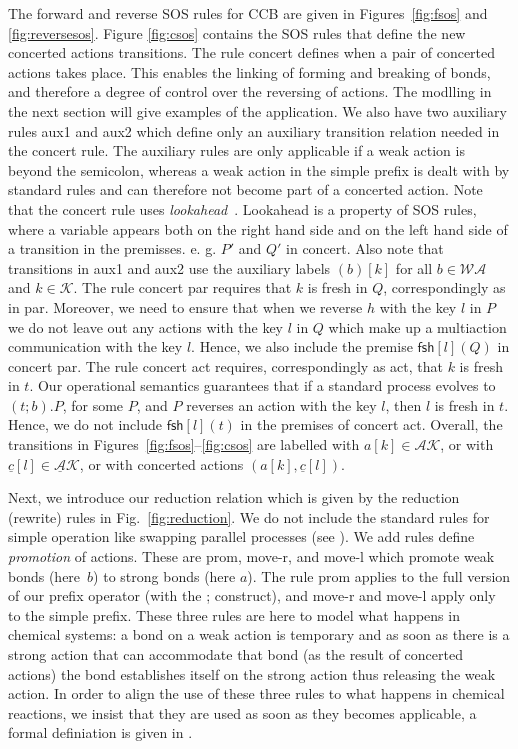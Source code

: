 \documentclass[runningheads]{llncs}
\newcommand{\mWA}{\mathcal{WA}}
\newcommand{\mAK}{\mathcal{AK}}
\newcommand{\umAK}{\underline{\mathcal{A}}\mathcal{K}}
\newcommand{\Keys}{\mathcal{K}}
\newcommand{\fresh}[2]{\mathsf{fsh}[#1](#2)}
\newcommand{\rulename}[1]{\textsf{#1}}
\begin{document}
The forward and reverse SOS rules for CCB are given in Figures~\ref{fig:fsos} and \ref{fig:reversesos}. 
Figure \ref{fig:csos} contains the SOS rules that define the new concerted actions transitions. 
The rule \rulename{concert} defines when a pair of concerted actions 
takes place. This enables the linking of forming and breaking of bonds, and therefore a degree of control over 
the reversing of actions. The modlling in the next section will give examples of the application. We also have two auxiliary rules \rulename{aux1} and \rulename{aux2} which 
define only an auxiliary transition relation needed in the \rulename{concert} rule. The auxiliary rules are only applicable if a weak action is beyond the semicolon, whereas a weak action in the simple prefix is dealt with by standard rules and can therefore not become part of a concerted action. Note that the \rulename{concert} rule uses \emph{lookahead}~\cite{Uli92}. Lookahead is a property of SOS rules, where a variable appears both on the right hand side and on the left hand side of a transition in the premisses. e. g. $P'$ and $Q'$ in \rulename{concert}. 
Also note that transitions in \rulename{aux1} and \rulename{aux2} use the auxiliary labels $(b)[k]$ 
for all $b \in \mWA$ and $k \in \Keys$. The rule \rulename{concert par} requires that $k$ is fresh in $Q$,
correspondingly as in \rulename{par}. Moreover, we need to ensure that when we reverse $h$ with the key $l$
in $P$ we do not leave out any actions with the key $l$ in $Q$ which make up a multiaction 
communication with the key $l$. Hence, we also include the premise $\fresh{l}{Q}$ in \rulename{concert par}.
The rule \rulename{concert act} requires, correspondingly as \rulename{act}, that $k$ is fresh in $t$.
Our operational semantics guarantees that if a standard process evolves to $(t;b).P$, for some $P$, and
$P$ reverses an action with the key $l$, then $l$ is fresh in $t$. Hence, we do not include $\fresh{l}{t}$
in the premises of \rulename{concert act}.
%
%
Overall, the transitions in Figures~\ref{fig:fsos}--\ref{fig:csos} are labelled with $a[k] \in \mAK$, or with 
$\underline{c}[l] \in \umAK$, or with concerted actions $(a[k], \underline{c}[l])$.

Next, we introduce our reduction relation which is given by the reduction (rewrite) rules 
in Fig.~\ref{fig:reduction}. We do not include the standard rules for simple operation like swapping parallel processes (see \cite{KUHN201818}). We add rules define {\em promotion} of actions. These are \rulename{prom}, \rulename{move-r}, and \rulename{move-l} which  
promote weak bonds (here~$b$) to strong bonds (here $a$).
The rule \rulename{prom} applies to the full version of our prefix operator (with the ; construct), and
\rulename{move-r} and \rulename{move-l} apply only to the simple prefix.
These three rules are here to model what happens in chemical systems: a bond on a weak action is 
temporary and as soon as there is a strong action that can accommodate that bond (as the result
of concerted actions) the bond establishes itself on the strong action thus releasing the weak action.
In order to align the use of these three rules to what happens in chemical reactions, we insist
that they are used as soon as they becomes applicable, a formal definiation is given in \cite{KUHN201818}.
\end{document}

